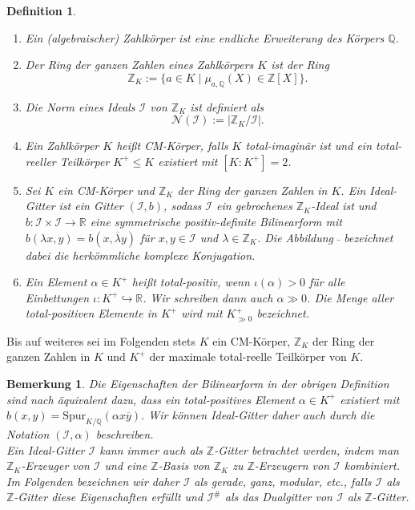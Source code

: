 \documentclass[12pt,a4paper,halfparskip,headsepline,bibtotocnumbered]{scrreprt}
\theoremstyle{nummermitklammern}
\newtheorem{definition}[defsatzusw]{Definition}
\newtheorem{bemerkung}[defsatzusw]{Bemerkung}
\theoremstyle{nonumberbreak}
\newcommand{\Z}{\mathbb{Z}}
\newcommand{\Q}{\mathbb{Q}}
\newcommand{\R}{\mathbb{R}}
\newcommand{\No}{\mathcal{N}}
\newcommand{\I}{\mathcal{I}}
\begin{document}
\begin{framed}
	\begin{definition}
		\begin{enumerate}[label=(\roman*)]
			\item Ein \textit{(algebraischer) Zahlkörper} ist eine endliche Erweiterung des Körpers $\Q$.
			\item Der \textit{Ring der ganzen Zahlen} eines Zahlkörpers $K$ ist der Ring
				\begin{equation*}
					\Z_K := \lbrace a \in K \mid \mu_{a, \Q}(X) \in \Z\left[X\right] \rbrace.
				\end{equation*}
			\item Die \textit{Norm} eines Ideals $\I$ von $\Z_K$ ist definiert als
				\begin{equation*}
					\No(\I) := \vert \Z_K / \I \vert.
				\end{equation*}
			\item Ein Zahlkörper $K$ heißt \textit{CM-Körper}, falls $K$ total-imaginär ist und ein total-reeller Teilkörper $K^+ \leq K$ existiert mit $\left[ K : K^+ \right] = 2$. 
			\item Sei $K$ ein CM-Körper und $\Z_K$ der Ring der ganzen Zahlen in $K$. Ein \textit{Ideal-Gitter} ist ein Gitter $(\I,b)$, sodass $\I$ ein gebrochenes $\Z_K$-Ideal ist und\linebreak
				$b:\I \times \I \rightarrow \R$ eine symmetrische positiv-definite Bilinearform mit $b(\lambda x, y) = b(x, \overline{\lambda} y)$ für $x,y \in \I$ und $\lambda \in \Z_K$. Die Abbildung $\bar{\ }$ bezeichnet dabei die herkömmliche komplexe Konjugation.
			\item Ein Element $\alpha \in K^+$ heißt \textit{total-positiv}, wenn $\iota(\alpha) > 0$ für alle Einbettungen $\iota : K^+ \hookrightarrow \R$. Wir schreiben dann auch $\alpha \gg 0$. Die Menge aller total-positiven Elemente in $K^+$ wird mit $K^+_{\gg 0}$ bezeichnet.
		\end{enumerate}
	\end{definition}
\end{framed}

Bis auf weiteres sei im Folgenden stets $K$ ein CM-Körper, $\Z_K$ der Ring der ganzen Zahlen in $K$ und $K^+$ der maximale total-reelle Teilkörper von $K$.

\begin{bemerkung}
	Die Eigenschaften der Bilinearform in der obrigen Definition sind nach \cite{fluckiger} äquivalent dazu, dass ein total-positives Element $\alpha \in K^+$ existiert mit $b(x,y) = \text{Spur}_{K/\Q}(\alpha x \overline{y})$. Wir können Ideal-Gitter daher auch durch die Notation $(\I, \alpha)$ beschreiben.\\
	Ein Ideal-Gitter $\I$ kann immer auch als $\Z$-Gitter betrachtet werden, indem man $\Z_K$-Erzeuger von $\I$ und eine $\Z$-Basis von $\Z_K$ zu $\Z$-Erzeugern von $\I$ kombiniert. Im Folgenden bezeichnen wir daher $\I$ als gerade, ganz, modular, etc., falls $\I$ als $\Z$-Gitter diese Eigenschaften erfüllt und $\I^\#$ als das Dualgitter von $\I$ als $\Z$-Gitter.
\end{bemerkung}
\end{document}
